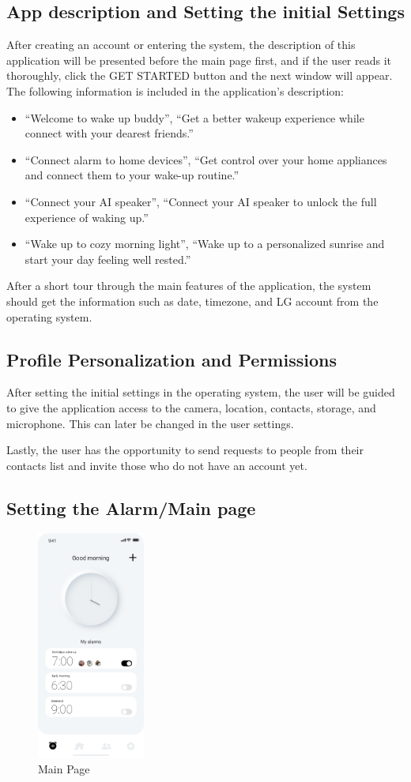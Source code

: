 \documentclass[conference]{IEEEtran}
\begin{document}
\subsection{App description and Setting the initial Settings}
After creating an account or entering the system, the description of this application will be presented before the main page first, and if the user reads it thoroughly, click the GET STARTED button and the next window will appear. The following information is included in the application's description:
\begin{itemize}
    \item “Welcome to wake up buddy”, “Get a better wakeup experience while connect with your dearest friends.”
    \item “Connect alarm to home devices”, “Get control over your home appliances and connect them to your wake-up routine.”
    \item “Connect your AI speaker”, “Connect your AI speaker to unlock the full experience of waking up.”
    \item “Wake up to cozy morning light”, “Wake up to a personalized sunrise and start your day feeling well rested.”
\end{itemize}
After a short tour through the main features of the application, the system should get the information such as date, timezone, and LG account from the operating system.


\subsection{Profile Personalization and Permissions}
After setting the initial settings in the operating system, the user will be guided to give the application access to the camera, location, contacts, storage, and microphone. This can later be changed in the user settings. \par
Lastly, the user has the opportunity to send requests to people from their contacts list and invite those who do not have an account yet.

\subsection{Setting the Alarm/Main page}
\begin{figure}[htbp]
    \centerline{\includegraphics[height=75mm,scale=0.5]{Images/MainPage.png}}
    \caption{Main Page}
    \label{fig}
\end{figure}
\end{document}
